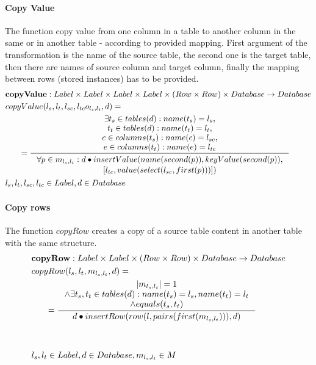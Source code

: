\documentclass[11pt]{article}
\begin{document}
\paragraph{Copy Value} The function copy value from one column in a table to another column in the same or in another table - according to provided mapping. First argument of the transformation is the name of the source table, the second one is the target table, then there are names of source column and target column, finally the mapping between rows (stored instances) has to be provided.
\begin{align*}
&	\mathbf{copyValue} : Label \times Label \times Label \times Label \times (Row \times Row) \times Database \rightarrow Database \\
&	copyValue(l_s, l_t, l_{sc}, l_{tc} o_{l_s, l_t}, d) = \\
& \;\;\;\;\;\; =	\inference{\exists t_s \in tables(d) : name(t_s) = l_s, \\ t_t \in tables(d) : name(t_t) = l_t, \\ c \in columns(t_s) : name(c) = l_{sc}, \\ e \in columns(t_t) : name(e) = l_{tc}}{\begin{gathered}
		\forall	p \in m_{l_s, l_t} :	d \bullet insertValue(name(second(p)), keyValue(second(p)), \\ [l_{tc},value(select(l_{sc}, first(p)))])
		\end{gathered}}\\
& 	l_s, l_t, l_{sc}, l_{tc} \in Label, d \in Database
\end{align*}

\paragraph{Copy rows} The function $copyRow$ creates a copy of a source table content in another table with the same structure. 
\begin{align*}
&	\mathbf{copyRow} : Label \times Label \times (Row \times Row) \times Database \rightarrow Database \\
&	copyRow(l_s, l_t, m_{l_s, l_t}, d) = \\
& \;\;\;\;\;\; =%
 	\inference{|m_{l_s, l_t}| = 1 \\ \wedge \exists t_s, t_t \in tables(d) : name(t_s) = l_s, name(t_t) = l_t \\ \wedge equals(t_s, t_t) }{d \bullet insertRow(row(l, pairs(first(m_{l_s, l_t}))), d)} \\\\
\\
&  l_s, l_t \in Label, d \in Database, m_{l_s, l_t} \in M
\end{align*}
\end{document}
